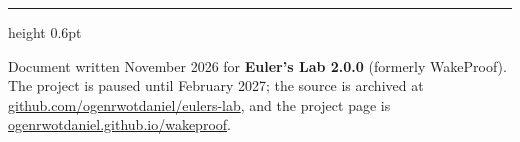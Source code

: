 \documentclass[11pt,a4paper]{article}
\begin{document}
\vspace{8pt}
{\color{wpborder}\hrule height 0.6pt}
\vspace{4pt}
{\sloppy\sffamily\footnotesize\color{wpmuted}Document written November 2026 for \textbf{Euler's Lab 2.0.0} (formerly WakeProof). The project is paused until February 2027; the source is archived at \href{https://github.com/ogenrwotdaniel/eulers-lab}{github.com/ogenrwotdaniel/eulers-lab}, and the project page is \href{https://ogenrwotdaniel.github.io/wakeproof/}{ogenrwotdaniel.github.io/wakeproof}.\par}
\end{document}
